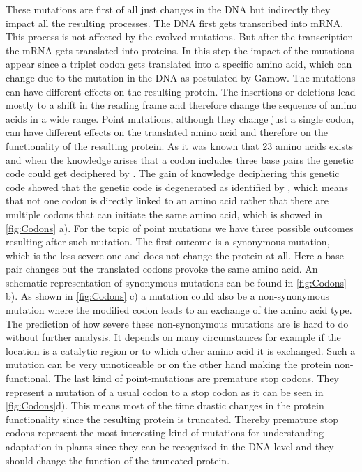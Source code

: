 These mutations are first of all just changes in the DNA but indirectly they impact all the resulting processes. The DNA first gets transcribed into mRNA. This process is not affected by the evolved mutations. But after the transcription the mRNA gets translated into proteins. In this step the impact of the mutations appear since a triplet codon gets translated into a specific amino acid, which can change due to the mutation in the DNA as postulated by Gamow\cite{crick1988}. The mutations can have different effects on the resulting protein. The insertions or deletions lead mostly to a shift in the reading frame and therefore change the sequence of amino acids in a wide range. Point mutations, although they change just a single codon, can have different effects on the translated amino acid and therefore on the functionality of the resulting protein. As it was known that 23 amino acids exists and when the knowledge arises that a codon includes three base pairs the genetic code could get deciphered by \textcite{Nirenberg1965}. The gain of knowledge deciphering this genetic code showed that the genetic code is degenerated as identified by \textcite{Lagerkvist1978}, which means that not one codon is directly linked to an amino acid rather that there are multiple codons that can initiate the same amino acid, which is showed in \autoref{fig:Codons} a). For the topic of point mutations we have three possible outcomes resulting after such mutation. The first outcome is a synonymous mutation, which is the less severe one and does not change the protein at all. Here a base pair changes but the translated codons provoke the same amino acid. An schematic representation of synonymous mutations can be found in \autoref{fig:Codons} b). As shown in \autoref{fig:Codons} c) a mutation could also be a non-synonymous mutation where the modified codon leads to an exchange of the amino acid type. The prediction of how severe these non-synonymous mutations are is hard to do without further analysis. It depends on many circumstances for example if the location is a catalytic region or to which other amino acid it is exchanged. Such a mutation can be very unnoticeable or on the other hand making the protein non-functional. The last kind of point-mutations are premature stop codons. They represent a mutation of a usual codon to a stop codon as it can be seen in \autoref{fig:Codons}d). This means most of the time drastic changes in the protein functionality since the resulting protein is truncated. Thereby premature stop codons represent the most interesting kind of mutations for understanding adaptation in plants since they can be recognized in the DNA level and they should change the function of the truncated protein.\\
